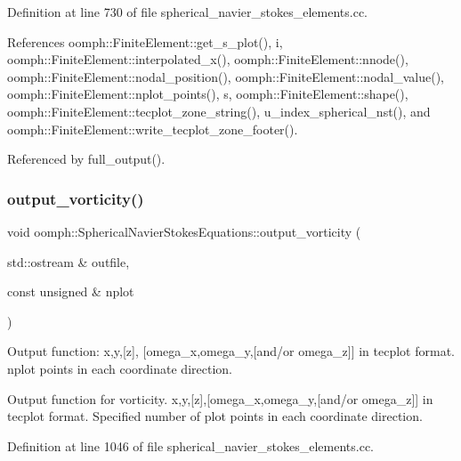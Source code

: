 Definition at line 730 of file spherical\+\_\+navier\+\_\+stokes\+\_\+elements.\+cc.



References oomph\+::\+Finite\+Element\+::get\+\_\+s\+\_\+plot(), i, oomph\+::\+Finite\+Element\+::interpolated\+\_\+x(), oomph\+::\+Finite\+Element\+::nnode(), oomph\+::\+Finite\+Element\+::nodal\+\_\+position(), oomph\+::\+Finite\+Element\+::nodal\+\_\+value(), oomph\+::\+Finite\+Element\+::nplot\+\_\+points(), s, oomph\+::\+Finite\+Element\+::shape(), oomph\+::\+Finite\+Element\+::tecplot\+\_\+zone\+\_\+string(), u\+\_\+index\+\_\+spherical\+\_\+nst(), and oomph\+::\+Finite\+Element\+::write\+\_\+tecplot\+\_\+zone\+\_\+footer().



Referenced by full\+\_\+output().

\mbox{\label{classoomph_1_1SphericalNavierStokesEquations_aa3c32bb2312a5bc8be5b164fb1631dac}} 
\subsubsection{\texorpdfstring{output\+\_\+vorticity()}{output\_vorticity()}}
{\footnotesize\ttfamily void oomph\+::\+Spherical\+Navier\+Stokes\+Equations\+::output\+\_\+vorticity (\begin{DoxyParamCaption}\item[{std\+::ostream \&}]{outfile,  }\item[{const unsigned \&}]{nplot }\end{DoxyParamCaption})}



Output function\+: x,y,\mbox{[}z\mbox{]}, \mbox{[}omega\+\_\+x,omega\+\_\+y,\mbox{[}and/or omega\+\_\+z\mbox{]}\mbox{]} in tecplot format. nplot points in each coordinate direction. 

Output function for vorticity. x,y,\mbox{[}z\mbox{]},\mbox{[}omega\+\_\+x,omega\+\_\+y,\mbox{[}and/or omega\+\_\+z\mbox{]}\mbox{]} in tecplot format. Specified number of plot points in each coordinate direction. 

Definition at line 1046 of file spherical\+\_\+navier\+\_\+stokes\+\_\+elements.\+cc.



